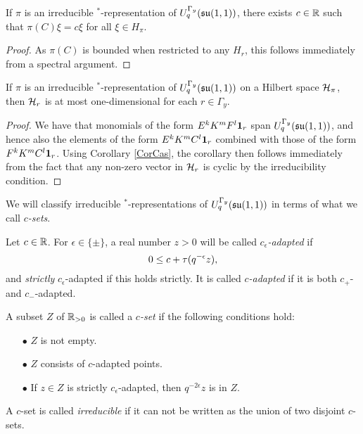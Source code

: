 


\begin{Lem}\label{CorCas} If $\pi$ is an irreducible $^*$-representation of $U_q^{\Gamma_y}(\mathfrak{su}(1,1))$, there exists $c\in \mathbb{R}$ such that $\pi(C)\xi = c\xi$ for all $\xi \in H_{\pi}$. 
\end{Lem} 
\begin{proof} As $\pi(C)$ is bounded when restricted to any $H_r$, this follows immediately from a spectral argument. 
\end{proof} 

\begin{Cor}\label{CorOneDim} If $\pi$ is an irreducible $^*$-representation of $U_q^{\Gamma_y}(\mathfrak{su}(1,1))$ on a Hilbert space $\mathcal{H}_{\pi}$, then $\mathcal{H}_r$ is at most one-dimensional for each $r\in \Gamma_y$. %
\end{Cor} 
\begin{proof} 
We have that monomials of the form $E^kK^mF^l\mathbf{1}_r$ span $U_q^{\Gamma_y}(\mathfrak{su}(1,1))$, and hence also the elements of the form $E^kK^mC^l\mathbf{1}_r$ combined with those of the form $F^kK^mC^l\mathbf{1}_r$. Using Corollary \ref{CorCas}, the corollary then follows immediately from the fact that any non-zero vector in $\mathcal{H}_r$ is cyclic by the irreducibility condition.
\end{proof}

We will classify irreducible $^*$-representations of $U_q^{\Gamma_y}(\mathfrak{su}(1,1))$ in terms of what we call \emph{$c$-sets}.  

\begin{Def}\label{DefAdapt} Let $c\in\mathbb{R}$. For $\epsilon \in \{\pm\}$, a real number $z>0$ will be called \emph{$c_{\epsilon}$-adapted} if \begin{equation}\label{EqAd+}  0 \leq c+ \operatorname{\tau}(q^{-\epsilon}z),\end{equation} and \emph{strictly} $c_{\epsilon}$-adapted if this holds strictly. It is called \emph{$c$-adapted} if it is both $c_+$- and $c_-$-adapted. 

A subset $Z$ of $\mathbb{R}_{>0}$ is called a \emph{$c$-set} if the following conditions hold: \begin{itemize} 
\item[$\bullet$] $Z$ is not empty.
\item[$\bullet$] $Z$ consists of $c$-adapted points.
\item[$\bullet$] If $z\in Z$ is strictly $c_{\epsilon}$-adapted, then $q^{-2\epsilon}z$ is in $Z$.
\end{itemize}
A $c$-set is called \emph{irreducible} if it can not be written as the union of two disjoint $c$-sets.
\end{Def}

